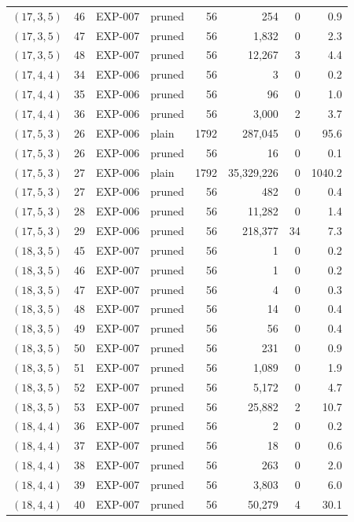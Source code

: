 \begin{longtable}{lrllrrrr}
$(17,3,5)$ & 46 & EXP-007 & pruned & 56 & 254 & 0 & 0.9 \\
$(17,3,5)$ & 47 & EXP-007 & pruned & 56 & 1{,}832 & 0 & 2.3 \\
$(17,3,5)$ & 48 & EXP-007 & pruned & 56 & 12{,}267 & 3 & 4.4 \\
$(17,4,4)$ & 34 & EXP-006 & pruned & 56 & 3 & 0 & 0.2 \\
$(17,4,4)$ & 35 & EXP-006 & pruned & 56 & 96 & 0 & 1.0 \\
$(17,4,4)$ & 36 & EXP-006 & pruned & 56 & 3{,}000 & 2 & 3.7 \\
$(17,5,3)$ & 26 & EXP-006 & plain & 1792 & 287{,}045 & 0 & 95.6 \\
$(17,5,3)$ & 26 & EXP-006 & pruned & 56 & 16 & 0 & 0.1 \\
$(17,5,3)$ & 27 & EXP-006 & plain & 1792 & 35{,}329{,}226 & 0 & 1040.2 \\
$(17,5,3)$ & 27 & EXP-006 & pruned & 56 & 482 & 0 & 0.4 \\
$(17,5,3)$ & 28 & EXP-006 & pruned & 56 & 11{,}282 & 0 & 1.4 \\
$(17,5,3)$ & 29 & EXP-006 & pruned & 56 & 218{,}377 & 34 & 7.3 \\
$(18,3,5)$ & 45 & EXP-007 & pruned & 56 & 1 & 0 & 0.2 \\
$(18,3,5)$ & 46 & EXP-007 & pruned & 56 & 1 & 0 & 0.2 \\
$(18,3,5)$ & 47 & EXP-007 & pruned & 56 & 4 & 0 & 0.3 \\
$(18,3,5)$ & 48 & EXP-007 & pruned & 56 & 14 & 0 & 0.4 \\
$(18,3,5)$ & 49 & EXP-007 & pruned & 56 & 56 & 0 & 0.4 \\
$(18,3,5)$ & 50 & EXP-007 & pruned & 56 & 231 & 0 & 0.9 \\
$(18,3,5)$ & 51 & EXP-007 & pruned & 56 & 1{,}089 & 0 & 1.9 \\
$(18,3,5)$ & 52 & EXP-007 & pruned & 56 & 5{,}172 & 0 & 4.7 \\
$(18,3,5)$ & 53 & EXP-007 & pruned & 56 & 25{,}882 & 2 & 10.7 \\
$(18,4,4)$ & 36 & EXP-007 & pruned & 56 & 2 & 0 & 0.2 \\
$(18,4,4)$ & 37 & EXP-007 & pruned & 56 & 18 & 0 & 0.6 \\
$(18,4,4)$ & 38 & EXP-007 & pruned & 56 & 263 & 0 & 2.0 \\
$(18,4,4)$ & 39 & EXP-007 & pruned & 56 & 3{,}803 & 0 & 6.0 \\
$(18,4,4)$ & 40 & EXP-007 & pruned & 56 & 50{,}279 & 4 & 30.1 \\

\end{longtable}
